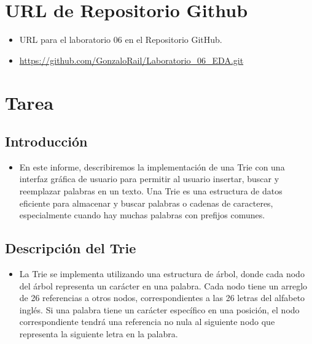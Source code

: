 \documentclass{article}
\begin{document}
	\section{URL de Repositorio Github}
	\begin{itemize}
		
		\item URL para el laboratorio 06 en el Repositorio GitHub.
		\item \url{https://github.com/GonzaloRail/Laboratorio_06_EDA.git}
	\end{itemize}
	
	
	\section{Tarea}
	\subsection{Introducción}
	\begin{itemize}
		\item En este informe, describiremos la implementación de una Trie con una interfaz gráfica de usuario para permitir al usuario insertar, buscar y reemplazar palabras en un texto. Una Trie es una estructura de datos eficiente para almacenar y buscar palabras o cadenas de caracteres, especialmente cuando hay muchas palabras con prefijos comunes.
	\end{itemize}
	\subsection{Descripción del Trie}
	\begin{itemize}
		\item La Trie se implementa utilizando una estructura de árbol, donde cada nodo del árbol representa un carácter en una palabra. Cada nodo tiene un arreglo de 26 referencias a otros nodos, correspondientes a las 26 letras del alfabeto inglés. Si una palabra tiene un carácter específico en una posición, el nodo correspondiente tendrá una referencia no nula al siguiente nodo que representa la siguiente letra en la palabra.
	\end{itemize}
\end{document}
